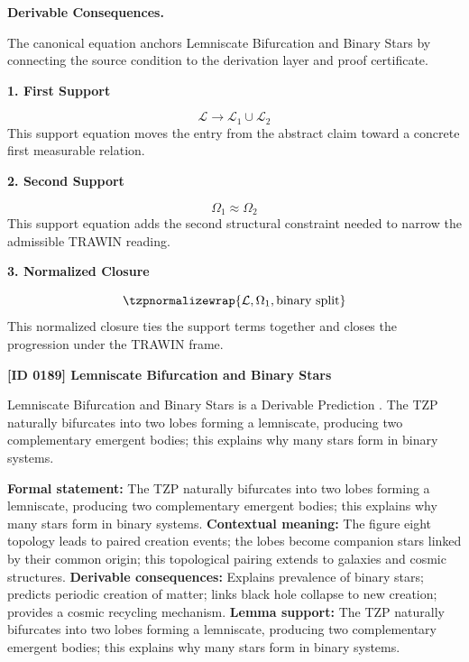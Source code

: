 \par\vspace{0.35em}
\noindent\textbf{Derivable Consequences.}\quad
\begingroup
\footnotesize
\raggedright
The canonical equation anchors Lemniscate Bifurcation and Binary Stars by connecting the source condition to the derivation layer and proof certificate.
\par\endgroup

\noindent\textbf{1. First Support}\par
\[
\mathcal{L} \rightarrow \mathcal{L}_1 \cup \mathcal{L}_2
\]
\noindent This support equation moves the entry from the abstract claim toward a concrete first measurable relation.\par
\noindent\textbf{2. Second Support}\par
\[
\Omega_1 \approx \Omega_2
\]
\noindent This support equation adds the second structural constraint needed to narrow the admissible TRAWIN reading.\par
\noindent\textbf{3. Normalized Closure}\par
\[
\tzpnormalizewrap{\mathcal{L},\Omega_1,\text{binary split}}
\]
\noindent This normalized closure ties the support terms together and closes the progression under the TRAWIN frame.\par

\clearpage
\noindent\textbf{[ID 0189] Lemniscate Bifurcation and Binary Stars}\par
\vspace{0.35em}
\begingroup\small
{}
Lemniscate Bifurcation and Binary Stars is a Derivable Prediction  . The TZP naturally bifurcates into two lobes forming a lemniscate, producing two complementary emergent bodies; this explains why many stars form in binary systems.  

\begingroup\footnotesize\setlength{\emergencystretch}{3em}\sloppy
\textbf{Formal statement:} The TZP naturally bifurcates into two lobes forming a lemniscate, producing two complementary emergent bodies; this explains why many stars form in binary systems.  
\textbf{Contextual meaning:} The figure eight topology leads to paired creation events; the lobes become companion stars linked by their common origin; this topological pairing extends to galaxies and cosmic structures.  
\textbf{Derivable consequences:} Explains prevalence of binary stars; predicts periodic creation of matter; links black hole collapse to new creation; provides a cosmic recycling mechanism.  
\textbf{Lemma support:} The TZP naturally bifurcates into two lobes forming a lemniscate, producing two complementary emergent bodies; this explains why many stars form in binary systems.  \par
\endgroup

